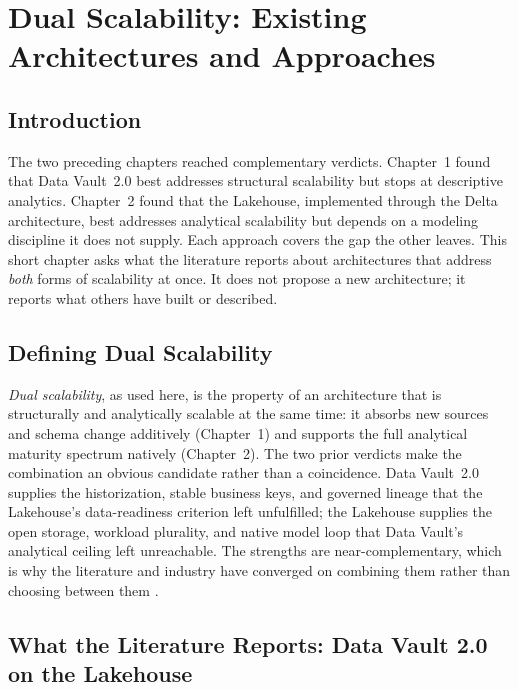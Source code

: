 \chapter{Dual Scalability: Existing Architectures and Approaches}

\section*{Introduction}

The two preceding chapters reached complementary verdicts. Chapter~1 found that Data Vault~2.0 best addresses structural scalability but stops at descriptive analytics. Chapter~2 found that the Lakehouse, implemented through the Delta architecture, best addresses analytical scalability but depends on a modeling discipline it does not supply. Each approach covers the gap the other leaves. This short chapter asks what the literature reports about architectures that address \textit{both} forms of scalability at once. It does not propose a new architecture; it reports what others have built or described.

\section{Defining Dual Scalability}
\label{sec:ch3-dual}

\textit{Dual scalability}, as used here, is the property of an architecture that is structurally and analytically scalable at the same time: it absorbs new sources and schema change additively (Chapter~1) and supports the full analytical maturity spectrum natively (Chapter~2). The two prior verdicts make the combination an obvious candidate rather than a coincidence. Data Vault~2.0 supplies the historization, stable business keys, and governed lineage that the Lakehouse's data-readiness criterion left unfulfilled; the Lakehouse supplies the open storage, workload plurality, and native model loop that Data Vault's analytical ceiling left unreachable. The strengths are near-complementary, which is why the literature and industry have converged on combining them rather than choosing between them \parencite{linstedt2015, armbrust2021}.

\section{What the Literature Reports: Data Vault 2.0 on the Lakehouse}
\label{sec:ch3-existing}

